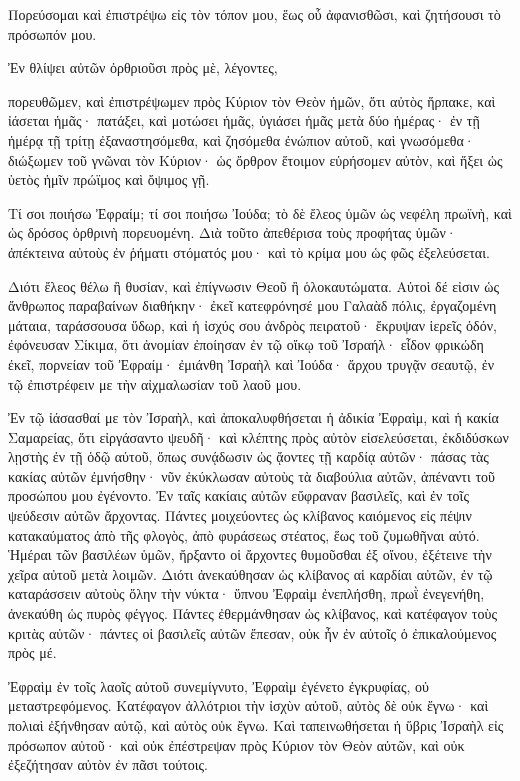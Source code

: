\begin{spacing}{1.1}
\begin{multicols}{2}
Πορεύσομαι καὶ ἐπιστρέψω εἰς τὸν τόπον μου, ἕως οὗ ἀφανισθῶσι, καὶ ζητήσουσι τὸ πρόσωπόν μου.

Ἐν θλίψει αὐτῶν ὀρθριοῦσι πρὸς μὲ, λέγοντες,

πορευθῶμεν, καὶ ἐπιστρέψωμεν πρὸς Κύριον τὸν Θεὸν ἡμῶν, ὅτι αὐτὸς ἥρπακε, καὶ ἰάσεται ἡμᾶς· πατάξει,
καὶ μοτώσει ἡμᾶς, ὑγιάσει ἡμᾶς μετὰ δύο ἡμέρας· ἐν τῇ ἡμέρᾳ τῇ τρίτῃ ἐξαναστησόμεθα,
καὶ ζησόμεθα ἐνώπιον αὐτοῦ, καὶ γνωσόμεθα· διώξωμεν τοῦ γνῶναι τὸν Κύριον· ὡς ὄρθρον ἕτοιμον εὑρήσομεν αὐτὸν, καὶ ἥξει ὡς ὑετὸς ἡμῖν πρώϊμος καὶ ὄψιμος γῇ.

Τί σοι ποιήσω Ἐφραίμ; τί σοι ποιήσω Ἰούδα; τὸ δὲ ἔλεος ὑμῶν ὡς νεφέλη πρωϊνὴ, καὶ ὡς δρόσος ὀρθρινὴ πορευομένη.
Διὰ τοῦτο ἀπεθέρισα τοὺς προφήτας ὑμῶν· ἀπέκτεινα αὐτοὺς ἐν ῥήματι στόματός μου· καὶ τὸ κρίμα μου ὡς φῶς ἐξελεύσεται.

Διότι ἔλεος θέλω ἢ θυσίαν, καὶ ἐπίγνωσιν Θεοῦ ἢ ὁλοκαυτώματα.
Αὐτοὶ δέ εἰσιν ὡς ἄνθρωπος παραβαίνων διαθήκην· ἐκεῖ κατεφρόνησέ μου Γαλαὰδ πόλις,
ἐργαζομένη μάταια, ταράσσουσα ὕδωρ,
καὶ ἡ ἰσχύς σου ἀνδρὸς πειρατοῦ· ἔκρυψαν ἱερεῖς ὁδόν, ἐφόνευσαν Σίκιμα, ὅτι ἀνομίαν ἐποίησαν ἐν τῷ οἴκῳ τοῦ Ἰσραήλ· εἶδον φρικώδη ἐκεῖ,
πορνείαν τοῦ Ἐφραίμ· ἐμιάνθη Ἰσραὴλ καὶ Ἰούδα· ἄρχου τρυγᾷν σεαυτῷ,
ἐν τῷ ἐπιστρέφειν με τὴν αἰχμαλωσίαν τοῦ λαοῦ μου.

Ἐν τῷ ἰάσασθαί με τὸν Ἰσραὴλ, καὶ ἀποκαλυφθήσεται ἡ ἀδικία Ἐφραὶμ, καὶ ἡ κακία Σαμαρείας, ὅτι εἰργάσαντο ψευδῆ· καὶ κλέπτης πρὸς αὐτὸν εἰσελεύσεται, ἐκδιδύσκων λῃστὴς ἐν τῇ ὁδῷ αὐτοῦ,
ὅπως συνᾴδωσιν ὡς ᾄοντες τῇ καρδίᾳ αὐτῶν· πάσας τὰς κακίας αὐτῶν ἐμνήσθην· νῦν ἐκύκλωσαν αὐτοὺς τὰ διαβούλια αὐτῶν, ἀπέναντι τοῦ προσώπου μου ἐγένοντο.
Ἐν ταῖς κακίαις αὐτῶν εὔφραναν βασιλεῖς, καὶ ἐν τοῖς ψεύδεσιν αὐτῶν ἄρχοντας.
Πάντες μοιχεύοντες ὡς κλίβανος καιόμενος εἰς πέψιν κατακαύματος ἀπὸ τῆς φλογὸς, ἀπὸ φυράσεως στέατος, ἕως τοῦ ζυμωθῆναι αὐτό.
Ἡμέραι τῶν βασιλέων ὑμῶν, ἤρξαντο οἱ ἄρχοντες θυμοῦσθαι ἐξ οἴνου, ἐξέτεινε τὴν χεῖρα αὐτοῦ μετὰ λοιμῶν.
Διότι ἀνεκαύθησαν ὡς κλίβανος αἱ καρδίαι αὐτῶν, ἐν τῷ καταράσσειν αὐτοὺς ὅλην τὴν νύκτα· ὕπνου Ἐφραὶμ ἐνεπλήσθη, πρωῒ ἐνεγενήθη, ἀνεκαύθη ὡς πυρὸς φέγγος.
Πάντες ἐθερμάνθησαν ὡς κλίβανος, καὶ κατέφαγον τοὺς κριτὰς αὐτῶν· πάντες οἱ βασιλεῖς αὐτῶν ἔπεσαν, οὐκ ἦν ἐν αὐτοῖς ὁ ἐπικαλούμενος πρὸς μέ.

Ἐφραὶμ ἐν τοῖς λαοῖς αὐτοῦ συνεμίγνυτο, Ἐφραὶμ ἐγένετο ἐγκρυφίας, οὐ μεταστρεφόμενος.
Κατέφαγον ἀλλότριοι τὴν ἰσχὺν αὐτοῦ, αὐτὸς δὲ οὐκ ἔγνω· καὶ πολιαὶ ἐξήνθησαν αὐτῷ, καὶ αὐτὸς οὐκ ἔγνω.
Καὶ ταπεινωθήσεται ἡ ὕβρις Ἰσραὴλ εἰς πρόσωπον αὐτοῦ· καὶ οὐκ ἐπέστρεψαν πρὸς Κύριον τὸν Θεὸν αὐτῶν, καὶ οὐκ ἐξεζήτησαν αὐτὸν ἐν πᾶσι τούτοις.


\end{multicols}
\end{spacing}
